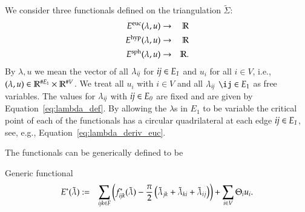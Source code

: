 \documentclass[Thesis]{subfiles}
\begin{document}
We consider three functionals defined on the triangulation $\tilde \Sigma$:
\begin{eqnarray*}
	E^{\rm euc}(\lambda,u) &\to& \mathbb R\\
	E^{\rm hyp}(\lambda,u) &\to& \mathbb R\\
	E^{\rm sph}(\lambda,u) &\to& \mathbb R.
\end{eqnarray*}
By $\lambda, u$ we mean the vector of all $\lambda_{\it ij}$ for $\it ij \in E_1$ and $u_i$ for all $i\in V$, i.e., $(\lambda, u)\in \mathbb R^{\# E_1}\times\mathbb R^{\#V}$.
We treat all $u_i$ with $i\in V$ and all $\lambda_{\it ij}$ $\ij \in E_1$ as free variables. The values for $\lambda_{\it ij}$ with $\it ij\in E_0$ are fixed and are given by Equation~\ref{eq:lambda_def}. By allowing the $\lambda$s in $E_1$ to be variable the critical point of each of the functionals has a circular quadrilateral at each edge $\it ij\in E_1$, see, e.g., Equation~\ref{eq:lambda_deriv_euc}.

The functionals can be generically defined to be
\begin{definition}{Generic functional}
\begin{eqnarray}
	E^*(\tilde\lambda) &:=& \sum_{\it ijk\in F}\left(f^*_{\it ijk}(\tilde\lambda) - \frac{\pi}{2}\left(\tilde \lambda_{jk} + \tilde \lambda_{ki} + \tilde \lambda_{ij}\right)\right) + \sum_{i\in V} \Theta_i u_i.
\end{eqnarray}
\end{definition}
\end{document}
